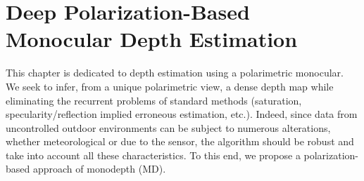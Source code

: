 
\chapter{Deep Polarization-Based Monocular Depth Estimation} %

\label{Chapter5} %





This chapter is dedicated to depth estimation using a polarimetric monocular. We seek to infer, from a unique polarimetric view, a dense depth map while eliminating the recurrent problems of standard methods (saturation, specularity/reflection implied erroneous estimation, etc.). Indeed, since data from uncontrolled outdoor environments can be subject to numerous alterations, whether meteorological or due to the sensor, the algorithm should be robust and take into account all these characteristics. To this end, we propose a polarization-based approach of monodepth (MD).\\

